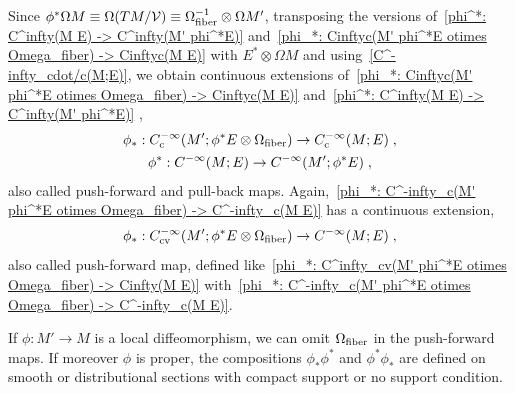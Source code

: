 \documentclass{memo-l}
\theoremstyle{plain}
\theoremstyle{definition}
\theoremstyle{remark}
\newcommand{\VV}{\mathcal{V}}
\newcommand{\fiber}{{\text{\rm fiber}}}
\newcommand{\co}{{\text{\rm c}}}
\newcommand{\cv}{{\text{\rm cv}}}
\numberwithin{section}{chapter}
\numberwithin{equation}{section}%
\begin{document}
Since $\phi^*\Omega M\equiv\Omega(TM/\VV)\equiv\Omega^{-1}_{\text{\rm fiber}}\otimes\Omega M'$, transposing the versions of~\eqref{phi^*: C^infty(M E) -> C^infty(M' phi^*E)} and~\eqref{phi_*: Cinftyc(M' phi^*E otimes Omega_fiber) -> Cinftyc(M E)} with $E^*\otimes\Omega M$ and using~\eqref{C^-infty_cdot/c(M;E)}, we obtain continuous extensions of~\eqref{phi_*: Cinftyc(M' phi^*E otimes Omega_fiber) -> Cinftyc(M E)} and~\eqref{phi^*: C^infty(M E) -> C^infty(M' phi^*E)} \cite[Theorem~6.1.2]{Hormander1971},
\begin{gather}
\phi_*:C^{-\infty}_\co(M';\phi^*E\otimes\Omega_\fiber)\to C^{-\infty}_\co(M;E)\;,
\label{phi_*: C^-infty_c(M' phi^*E otimes Omega_fiber) -> C^-infty_c(M E)}\\
\phi^*:C^{-\infty}(M;E)\to C^{-\infty}(M';\phi^*E)\;,
\label{phi_*: C^-infty(M E) -> C^-infty(M' phi^*E)}
\end{gather}
also called push-forward and pull-back maps. Again,~\eqref{phi_*: C^-infty_c(M' phi^*E otimes Omega_fiber) -> C^-infty_c(M E)} has a continuous extension,
\begin{equation}\label{phi_*: C^-infty_cv(M' phi^*E otimes Omega_fiber) -> C^-infty(M E)}
\phi_*:C^{-\infty}_\cv(M';\phi^*E\otimes\Omega_\fiber)\to C^{-\infty}(M;E)\;,
\end{equation}
also called push-forward map, defined like~\eqref{phi_*: C^infty_cv(M' phi^*E otimes Omega_fiber) -> Cinfty(M E)} with~\eqref{phi_*: C^-infty_c(M' phi^*E otimes Omega_fiber) -> C^-infty_c(M E)}.

If $\phi:M'\to M$ is a local diffeomorphism, we can omit $\Omega_\fiber$ in the push-forward maps. If moreover $\phi$ is proper, the compositions $\phi_*\phi^*$ and $\phi^*\phi_*$ are defined on smooth or distributional sections with compact support or no support condition.

  
\end{document}
